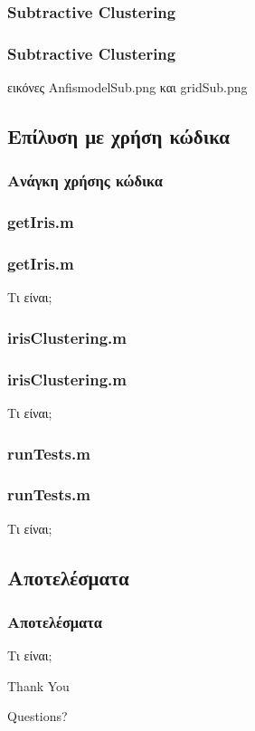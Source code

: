 \documentclass[xetex,serif,mathserif,14pt]{beamer}
\begin{document}
\subsubsection{Subtractive Clustering}
\begin{frame}
\frametitle{Subtractive Clustering}
εικόνες AnfismodelSub.png και gridSub.png
\end{frame}
\subsection{Επίλυση με χρήση κώδικα}

\begin{frame}
\frametitle{Ανάγκη χρήσης κώδικα}

\end{frame}

\subsubsection{getIris.m}
\begin{frame}
\frametitle{getIris.m}
Τι είναι;
\end{frame}


\subsubsection{irisClustering.m}
\begin{frame}
\frametitle{irisClustering.m}
Τι είναι;
\end{frame}

\subsubsection{runTests.m}
\begin{frame}
\frametitle{runTests.m}
Τι είναι;
\end{frame}

\subsection{Αποτελέσματα}
\begin{frame}
\frametitle{Αποτελέσματα}
Τι είναι;
\end{frame}



\begin{frame}

\Huge{\centerline{Thank You}}
\Large{\centerline{Questions?}}
\end{frame}
\end{document}
